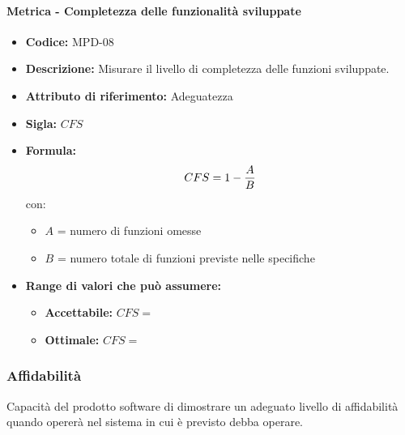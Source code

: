     \paragraph{Metrica - Completezza delle funzionalità sviluppate} 
        \begin{itemize}
        \item  \textbf{Codice:} MPD-08
        \item  \textbf{Descrizione:} Misurare il livello di completezza delle funzioni sviluppate.
        \item  \textbf{Attributo di riferimento:} Adeguatezza
        \item  \textbf{Sigla:} $CFS$
        \item  \textbf{Formula:} $$CFS = 1 - {A \over B}$$
        con:
        \begin{itemize}
            \item $A$ = numero di funzioni omesse
            \item $B$ = numero totale di funzioni previste nelle specifiche       
        \end{itemize}

        \item \textbf{Range di valori che può assumere:}
        \begin{itemize}
            \item \textbf{Accettabile:} $CFS = $
            \item \textbf{Ottimale:} $CFS = $
        \end{itemize}
    \end{itemize}
              
\subsubsection{Affidabilità}
   Capacità del prodotto software di dimostrare un adeguato livello di affidabilità quando opererà nel sistema in cui è previsto debba operare.
       
